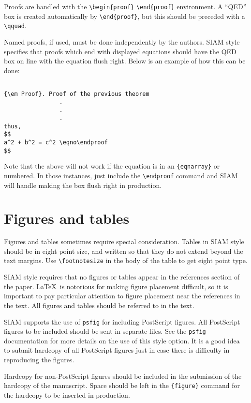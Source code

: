 Proofs are handled with the \verb|\begin{proof}|
\verb|\end{proof}| environment. A ``QED'' box is created
automatically by \verb|\end{proof}|, but this should be
preceded with a \verb|\qquad|.

Named proofs, if used, must be done independently by the
authors. SIAM style specifies that proofs which end with
displayed equations should have the QED box on line with
the equation flush right. Below is an example of how this
can be done:

\begin{verbatim}

{\em Proof}. Proof of the previous theorem 
                .
                .
                .
thus,
$$
a^2 + b^2 = c^2 \eqno\endproof
$$

\end{verbatim}

Note that the above will not work if the equation is in an
\verb|{eqnarray}| or numbered. In those instances, just include the
\verb|\endproof| command and SIAM will handle making the box
flush right in production. 


\section{Figures and tables}
Figures and tables sometimes require special consideration.
Tables in SIAM style should be in eight point size, and
written so that they do not extend beyond the text margins. Use
\verb|\footnotesize| in the body of the table to get eight
point type.

SIAM style requires that no figures or tables  appear in the
references section of the paper. \LaTeX\ is notorious for
making figure placement difficult, so it is important to
pay particular attention to figure placement near the
references in the text. All figures and tables should
be referred to in the text.

SIAM supports the use of {\tt psfig} for including {\sc PostScript}
figures. All {\sc Post\-Script} figures to be included should be sent in
separate files. See the {\tt psfig} documentation for more
details on the use of this style option. It is a good idea
to submit hardcopy of all {\sc PostScript} figures just in case
there is difficulty in reproducing the figures.

Hardcopy for non-{\sc PostScript} figures should be included in
the submission of the hardcopy of the manuscript. Space
should be left in the \verb|{figure}| command for the
hardcopy to be inserted in production.

